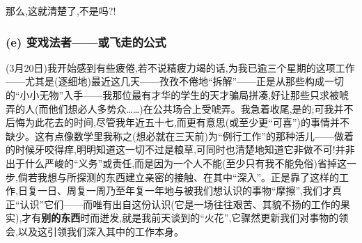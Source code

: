 那么,这就清楚了,不是吗?!

\subsubsection*{(e) 变戏法者——或飞走的公式}



(3月20日)我开始感到有些疲倦,若不说精疲力竭的话,为我已逾三个星期的这项工作——尤其是(逐细地)最近这几天——孜孜不倦地“拆解”——正是从那些构成一切的“小小无物”入手——我那位最有才华的学生的天才骗局拼凑,好让那些只求被唬弄的人(而他们想必人多势众……)在公共场合上受唬弄。我急着收尾,是的;可我并不后悔为此花去的时间,尽管我年近五十七,而更有意思(或至少更“可喜”)的事情并不缺少。这有点像数学里我称之(想必就在三天前)为“例行工作”的那种活儿——做着的时候牙咬得痒,明明知道这一切不过是粮草,可同时也清楚地知道它非做不可!并非出于什么严峻的“义务”或责任,而是因为一个人不能(至少只有我不能免俗)省掉这一步,倘若我想与所探测的东西建立亲密的接触、在其中“深入”。正是靠了这样的工作,日复一日、周复一周乃至年复一年地与被我们想认识的事物“摩擦”,我们才真正“认识”它们——而唯有出自这份认识(它是一场往往艰苦、其貌不扬的工作的果实),才有\textbf{别的东西}时而迸发,就是我前天谈到的“火花”,它骤然更新我们对事物的领会,以及这引领我们深入其中的工作本身。

